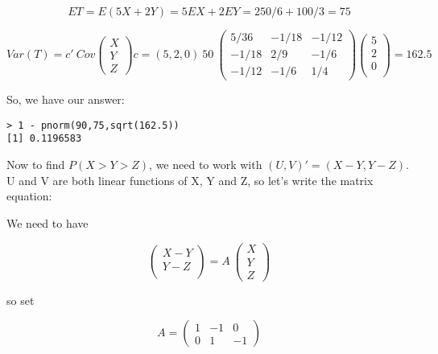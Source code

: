 \begin{equation}
ET = E(5X+2Y) = 5 EX + 2 EY = 250/6 + 100/3 = 75
\end{equation}

\begin{equation}
Var(T) =
c' ~ Cov
\left (
\begin{array}{c}
X \\
Y \\
Z 
\end{array}
\right )
c
=
(5,2,0) ~
50 ~
\left (
\begin{array}{rrr}
5/36 & -1/18 & -1/12 \\
-1/18 & 2/9 & -1/6 \\
-1/12 & -1/6 & 1/4 
\end{array}
\right )
\left (
\begin{array}{r}
5 \\
2 \\
0 \\
\end{array}
\right )
= 162.5
\end{equation}

So, we have our answer:

\begin{lstlisting}
> 1 - pnorm(90,75,sqrt(162.5))
[1] 0.1196583
\end{lstlisting}

Now to find $P(X > Y > Z)$, we need to work with $(U,V)' = (X-Y,Y-Z)$. 
U and V are both linear functions of X, Y and Z, so let's write the
matrix equation:

We need to have

\begin{equation}
\left (
\begin{array}{r}
X-Y \\
Y-Z \\
\end{array}
\right )
=
A ~
\left (
\begin{array}{c}
X \\
Y \\
Z 
\end{array}
\right )
\end{equation}

so set

\begin{equation}
   A = 
      \left (
      \begin{array}{rrr}
      1 & -1 & 0\\
      0 & 1 & -1   
      \end{array}
      \right )     
\end{equation}

